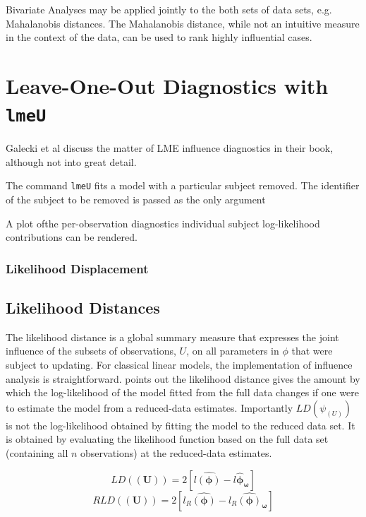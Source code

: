 \documentclass[12pt, a4paper]{report}
\theoremstyle{plain}
\theoremstyle{definition}
\theoremstyle{remark}
\begin{document}
Bivariate Analyses may be applied jointly to the both sets of data sets, e.g. Mahalanobis distances. The Mahalanobis distance, while not an intuitive measure in the context of the data, can be used to rank highly influential cases. 


\section*{Leave-One-Out Diagnostics with \texttt{lmeU}}
Galecki et al discuss the matter of LME influence diagnostics in their book, although not into great detail.


The command \texttt{lmeU} fits a model with a particular subject removed. The identifier of the subject to be removed is passed as the only argument

A plot ofthe per-observation diagnostics individual subject log-likelihood contributions can be rendered.

\subsubsection*{Likelihood Displacement}

\subsection{Likelihood Distances}

The  likelihood distance is a global summary measure that expresses the joint influence of the subsets of observations, $U$, on all parameters in $\phi$ that were subject to updating. For classical linear models, the implementation of influence analysis is straightforward. \citet{schab} points out the likelihood distance gives the amount by which the log-likelihood of the model fitted from the full data changes if one were
to estimate the model from a reduced-data estimates. Importantly $LD(\psi_{(U)})$ is not the log-likelihood obtained by fitting the model to the reduced data set. It is obtained by evaluating the likelihood function based on the full data set (containing all $n$ observations) at the reduced-data estimates.


\[  LD(\boldsymbol{(U)})= 2[l\boldsymbol{\hat{(\phi)}} - l\boldsymbol{\hat{\phi}_\omega} ] \]
\[  RLD(\boldsymbol{(U)})= 2[ l_R\boldsymbol{\hat{(\phi)}} - l_R\boldsymbol{\hat{(\phi)}_\omega} ] \]
\end{document}
